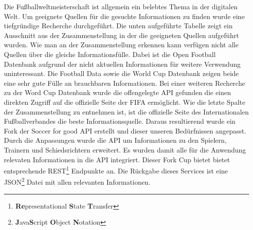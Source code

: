 \documentclass[runningheads,a4paper]{llncs}
\begin{document}
Die Fußballweltmeisterschaft ist allgemein ein belebtes Thema in der digitalen Welt. Um geeignete Quellen für die gesuchte Informationen zu finden wurde eine tiefgründige Recherche durchgeführt. Die unten aufgeführte Tabelle zeigt ein Ausschnitt aus der Zusammenstellung in der die geeigneten Quellen aufgeführt wurden. Wie man an der Zusammenstellung erkennen kann verfügen nicht alle Quellen über die gleiche Informationsfülle. Dabei ist die Open Football \cite{url_openfootball} Datenbank aufgrund der nicht aktuellen Informationen für weitere Verwendung uninteressant. Die Football Data \cite{url_footballdata} sowie die World Cup \cite{url_worldcup} Datenbank zeigen beide eine sehr gute Fülle an brauchbaren Informationen. Bei einer weiteren Recherche zu der Word Cup Datenbank wurde die offengelegte API gefunden die einen direkten Zugriff auf die offizielle Seite der FIFA ermöglicht. Wie die letzte Spalte der Zusammenstellung zu entnehmen ist, ist die offizielle Seite des Internationalen Fußballverbandes die beste Informationsquelle. 
Daraus resultierend wurde ein Fork der Soccer for good API erstellt und dieser unseren Bedürfnissen angepasst. Durch die Anpassungen wurde die API um Informationen zu den Spielern, Trainern und Schiedsrichtern erweitert. Es wurden damit alle für die Anwendung relevaten Informationen in die API integriert. Dieser Fork Cup bietet bietet entsprechende REST\footnote{\textbf{Re}presentational \textbf{S}tate \textbf{T}ransfer} Endpunkte an. Die Rückgabe dieses Services ist eine JSON\footnote{\textbf{J}ava\textbf{S}cript \textbf{O}bject \textbf{N}otation} Datei mit allen relevanten Informationen. 
\end{document}
